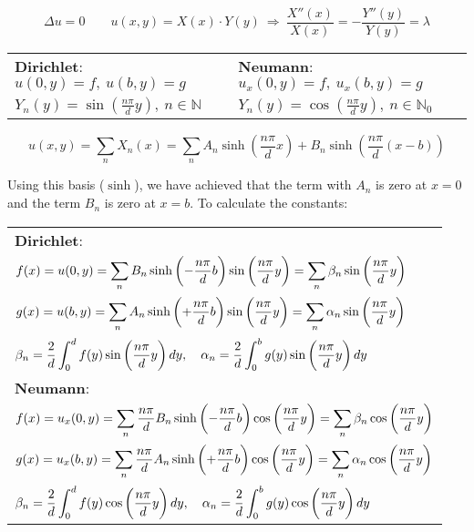 \documentclass{article}
\begin{document}
\begin{twocolumn}
$$\Delta u = 0 \qquad u(x,y) = X(x) \cdot Y(y) \ \Rightarrow \ \frac{X''(x)}{X(x)} = - \frac{Y''(y)}{Y(y)} = \lambda$$

\begin{tabular}{C{.47\columnwidth}|C{.5\columnwidth}}
	\textbf{Dirichlet}:	$u(0,y) = f, \ u(b,y) = g$ & \textbf{Neumann}: $u_x(0,y) = f, \ u_x(b,y) = g$ \\
	$Y_n(y) = \sin\left(\frac{n\pi}{d} y\right), \ n \in \mathbb{N}$ &
	$Y_n(y) = \cos\left(\frac{n\pi}{d} y\right), \ n \in \mathbb{N}_0 $ \\
\end{tabular}

$$u(x,y) = \sum_n X_n(x) = \sum_n A_n \sinh\left(\frac{n\pi}{d} x\right) + B_n \sinh\left(\frac{n\pi}{d} (x-b)\right)$$

Using this basis ($\sinh$), we have achieved that the term with $A_n$ is zero at $x=0$ and the term $B_n$ is zero at $x = b$. To calculate the constants:

\begin{tabular}{C{.95\columnwidth}}
	\textbf{Dirichlet}:\\
	$\displaystyle f(x) = u(0,y) = \sum_n B_n \sinh\left(-\frac{n\pi}{d} b\right) \sin\left(\frac{n\pi}{d} y\right) = \sum_n \beta_n \sin\left(\frac{n\pi}{d} y\right)$ \\
	$\displaystyle g(x) = u(b,y) = \sum_n A_n \sinh\left(+\frac{n\pi}{d} b\right) \sin\left(\frac{n\pi}{d} y\right) = \sum_n \alpha_n \sin\left(\frac{n\pi}{d} y\right)$ \\
	$\displaystyle \beta_n = \frac{2}{d} \int_{0}^{d} f(y) \sin\left(\frac{n\pi}{d} y\right) dy, \quad \alpha_n = \frac{2}{d} \int_0^b g(y) \sin\left(\frac{n\pi}{d} y\right)dy$ \\ \midrule
	\textbf{Neumann}: \\
	$\displaystyle f(x) = u_x(0,y) = \sum_n \frac{n\pi}{d} B_n \sinh\left(-\frac{n\pi}{d} b\right) \cos\left(\frac{n\pi}{d} y\right) = \sum_n \beta_n \cos\left(\frac{n\pi}{d} y\right)$ \\
	$\displaystyle g(x) = u_x(b,y) = \sum_n \frac{n\pi}{d} A_n \sinh\left(+\frac{n\pi}{d} b\right) \cos\left(\frac{n\pi}{d} y\right) = \sum_n \alpha_n \cos\left(\frac{n\pi}{d} y\right)$ \\
	$\displaystyle \beta_n = \frac{2}{d} \int_{0}^{d} f(y) \cos\left(\frac{n\pi}{d} y\right) dy, \quad \alpha_n = \frac{2}{d} \int_0^b g(y) \cos\left(\frac{n\pi}{d} y\right)dy$ \\ \midrule
	
\end{tabular}


\end{twocolumn}
\end{document}
